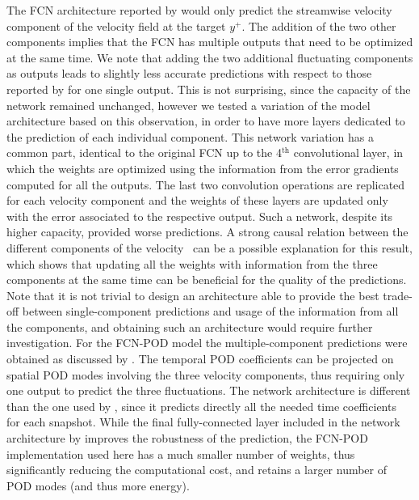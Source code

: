 The FCN architecture reported by \citet{guastoni2020prediction} would only predict the streamwise velocity component of the velocity field at the target $y^+$.
The addition of the two other components implies that the FCN has multiple outputs that need to be optimized at the same time. We note that adding the two additional fluctuating components as outputs leads to slightly less accurate predictions with respect to those reported by \citet{guastoni2020prediction} for one single output.
This is not surprising, since the capacity of the network remained unchanged, however we tested a variation of the model architecture based on this observation, in order to have more layers dedicated to the prediction of each individual component.
This network variation has a common part, identical to the original FCN up to the 4$^{\text{th}}$ convolutional layer, in which the weights are optimized using the information from the error gradients computed for all the outputs.
The last two convolution operations are replicated for each velocity component and the weights of these layers are updated only with the error associated to the respective output.
Such a network, despite its higher capacity, provided worse predictions.
A strong causal relation between the different components of the velocity~\citep{lozano2020causality} can be a possible explanation for this result, which shows that updating all the weights with information from the three components at the same time can be beneficial for the quality of the predictions.
Note that it is not trivial to design an architecture able to provide the best trade-off between single-component predictions and usage of the information from all the components, and obtaining such an architecture would require further investigation.
For the FCN-POD model the multiple-component predictions were obtained as discussed by \citet{guemes2019sensing}.
The temporal POD coefficients can be projected on spatial POD modes involving the three velocity components, thus requiring only one output to predict the three fluctuations.
The network architecture is different than the one used by \citet{guemes2019sensing}, since it predicts directly all the needed time coefficients for each snapshot.
While the final fully-connected layer included in the network architecture by \citet{guemes2019sensing} improves the robustness of the prediction, the FCN-POD implementation used here has a much smaller number of weights, thus significantly reducing the computational cost, and retains a larger number of POD modes (and thus more energy).


